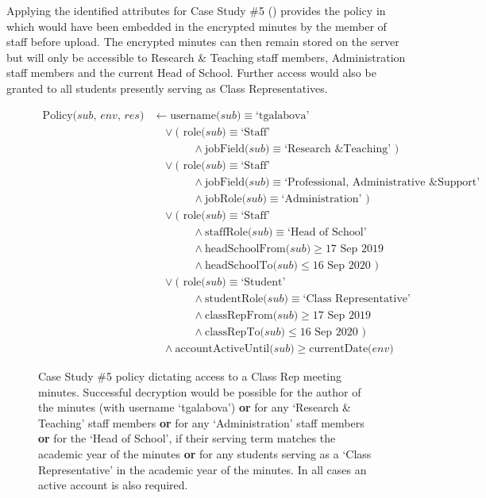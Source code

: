 Applying the identified attributes for Case Study \#5 () provides the \thePolicyLang policy in  which would have been embedded in the encrypted minutes by the member of staff before upload. The encrypted minutes can then remain stored on the server but will only be accessible to Research \& Teaching staff members, Administration staff members and the current Head of School. Further access would also be granted to all students presently serving as Class Representatives.

\begin{figure}[ht]
  \centering
\begin{align*}
  \text{Policy($sub$, $env$, $res$)}
  &
    \leftarrow
    \text{username($sub$)} \equiv \text{`tgalabova'}
  \\
  &
    \phantom{::}\vee
    \text{( role($sub$)} \equiv \text{`Staff'}
  \\
  &
    \phantom{::::::::}\wedge
    \text{jobField($sub$)} \equiv \text{`Research \& Teaching' )}
  \\
  &
    \phantom{::}\vee
    \text{( role($sub$)} \equiv \text{`Staff'}
  \\
  &
    \phantom{::::::::}\wedge
    \text{jobField($sub$)} \equiv \text{`Professional, Administrative \& Support'}
  \\
  &
    \phantom{::::::::}\wedge
    \text{jobRole($sub$)} \equiv \text{`Administration' )}
  \\
  &
    \phantom{::}\vee
    \text{( role($sub$)} \equiv \text{`Staff'}
  \\
  &
    \phantom{::::::::}\wedge
    \text{staffRole($sub$)} \equiv \text{`Head of School'}
  \\
  &
    \phantom{::::::::}\wedge
    \text{headSchoolFrom($sub$)} \geq \text{17 Sep 2019}
  \\
  &
    \phantom{::::::::}\wedge
    \text{headSchoolTo($sub$)} \leq \text{16 Sep 2020 )}
  \\
  &
    \phantom{::}\vee
    \text{( role($sub$)} \equiv \text{`Student'}
  \\
  &
    \phantom{::::::::}\wedge
    \text{studentRole($sub$)} \equiv \text{`Class Representative'}
  \\
  &
    \phantom{::::::::}\wedge
    \text{classRepFrom($sub$)} \geq \text{17 Sep 2019}
  \\
  &
    \phantom{::::::::}\wedge
    \text{classRepTo($sub$)} \leq \text{16 Sep 2020 )}
  \\
  &
    \phantom{::}\wedge
    \text{accountActiveUntil($sub$)} \geq \text{currentDate($env$)}
\end{align*}
  \caption{
    \label{fig:case_study_policy_5}
    Case Study \#5 policy dictating access to a Class Rep meeting minutes.
    Successful decryption would be possible for the author of the minutes (with username `tgalabova') \textbf{or} for any `Research \& Teaching' staff members \textbf{or} for any `Administration' staff members \textbf{or} for the `Head of School', if their serving term matches the academic year of the minutes \textbf{or} for any students serving as a `Class Representative' in the academic year of the minutes. In all cases an active account is also required.
  }
\end{figure}
